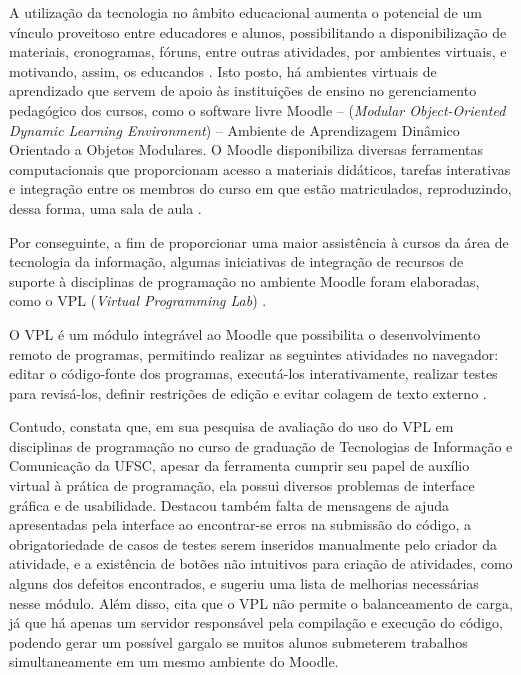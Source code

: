 




A utilização da tecnologia no âmbito educacional aumenta o potencial de um vínculo proveitoso entre educadores e alunos, possibilitando a disponibilização de materiais, cronogramas, fóruns, entre outras atividades, por ambientes virtuais, e motivando, assim, os educandos  \cite[p.~18-19]{franciscojuniorambrosio}. Isto posto, há ambientes virtuais de aprendizado que servem de apoio às instituições de ensino no gerenciamento pedagógico dos cursos, como o software livre Moodle – (\textit{Modular Object-Oriented Dynamic Learning Environment}) – Ambiente de Aprendizagem Dinâmico Orientado a Objetos Modulares. O Moodle disponibiliza diversas ferramentas computacionais que proporcionam acesso a materiais didáticos, tarefas interativas e integração entre os membros do curso em que estão matriculados, reproduzindo, dessa forma, uma sala de aula \cite{limamoodle}. 

Por conseguinte, a fim de proporcionar uma maior assistência à cursos da área de tecnologia da informação, algumas iniciativas de integração de recursos de suporte à disciplinas de programação no ambiente Moodle foram elaboradas, como o VPL (\textit{Virtual Programming Lab})  \cite[p.~712]{franca2011}. 

O VPL é um módulo integrável ao Moodle que possibilita o desenvolvimento remoto de programas, permitindo realizar as seguintes atividades no navegador: editar o código-fonte dos programas, executá-los interativamente, realizar testes para revisá-los, definir restrições de edição e evitar colagem de texto externo \cite{rodriguezdelpino}. 

Contudo, \textcite[p.~129]{freitas} constata que, em sua pesquisa de avaliação do uso do VPL em disciplinas de programação no curso de graduação de Tecnologias de Informação e Comunicação da UFSC, apesar da ferramenta cumprir seu papel de auxílio virtual à prática de programação, ela possui diversos problemas de interface gráfica e de usabilidade. Destacou também falta de mensagens de ajuda apresentadas pela interface ao encontrar-se erros na submissão do código, a obrigatoriedade de casos de testes serem inseridos manualmente pelo criador da atividade, e a existência de botões não intuitivos para criação de atividades, como alguns dos defeitos encontrados, e sugeriu uma lista de melhorias necessárias nesse módulo.  Além disso, \textcite[p.~58]{freitas} cita que o VPL não permite o balanceamento de carga, já que há apenas um servidor responsável pela compilação e execução do código, podendo gerar um possível gargalo se muitos alunos submeterem trabalhos simultaneamente em um mesmo ambiente do Moodle. 


